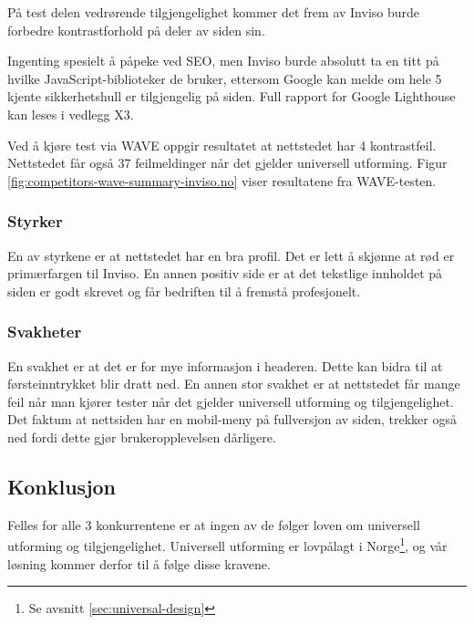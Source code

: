 På test delen vedrørende tilgjengelighet kommer det frem av Inviso burde forbedre kontrastforhold på deler av siden sin.

Ingenting spesielt å påpeke ved SEO, men Inviso burde absolutt ta en titt på hvilke JavaScript-biblioteker de bruker, ettersom Google kan melde om hele 5 kjente sikkerhetshull er tilgjengelig på siden. Full rapport for Google Lighthouse kan leses i vedlegg X3.

Ved å kjøre test via WAVE oppgir resultatet at nettstedet har 4 kontrastfeil. Nettstedet får også 37 feilmeldinger når det gjelder universell utforming. Figur \ref{fig:competitors-wave-summary-inviso.no} viser resultatene fra WAVE-testen.

\subsubsection{Styrker} 
En av styrkene er at nettstedet har en bra profil. Det er lett å skjønne at rød er primærfargen til Inviso. En annen positiv side er at det tekstlige innholdet på siden er godt skrevet og får bedriften til å fremstå profesjonelt.

\subsubsection{Svakheter}
En svakhet er at det er for mye informasjon i headeren. Dette kan bidra til at førsteinntrykket blir dratt ned. En annen stor svakhet er at nettstedet får mange feil når man kjører tester når det gjelder universell utforming og tilgjengelighet. Det faktum at nettsiden har en mobil-meny på fullversjon av siden, trekker også ned fordi dette gjør brukeropplevelsen dårligere.

\subsection{Konklusjon}
Felles for alle 3 konkurrentene er at ingen av de følger loven om universell utforming og tilgjengelighet. Universell utforming er lovpålagt i Norge\footnote{Se avsnitt \ref{sec:universal-design}}, og vår løsning kommer derfor til å følge disse kravene. 


